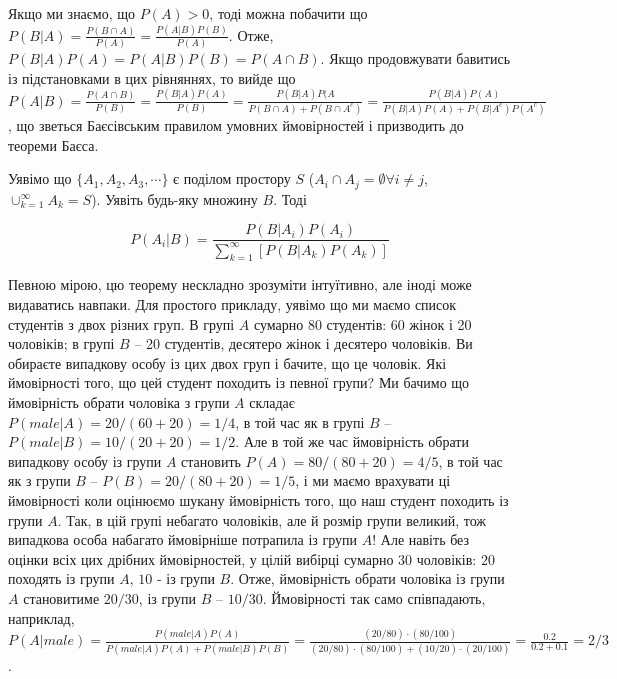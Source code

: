 \documentclass[
  11pt,
]{book}
\begin{document}
Якщо ми знаємо, що \(P(A)>0\), тоді можна побачити що \(P(B|A) = \frac{P(B \cap A)}{P(A)} = \frac{P(A | B)P(B)}{P(A)}\). Отже, \(P(B|A)P(A)=P(A|B)P(B)=P(A \cap B)\). Якщо продовжувати бавитись із підстановками в цих рівняннях, то вийде що \(P(A|B) = \frac{P(A \cap B)}{P(B)} = \frac{P(B|A) P(A)}{P(B)} = \frac{P(B|A)P(A}{P(B \cap A) + P(B \cap A^c)} = \frac{P(B|A)P(A)}{P(B|A) P(A) + P(B|A^c)P(A^c)}\), що зветься Баєсівським правилом умовних ймовірностей і призводить до теореми Баєса.

Уявімо що \(\{A_1, A_2, A_3, \cdots\}\) є поділом простору \(S\) (\(A_i \cap A_j = \emptyset \forall i \neq j\), \(\cup_{k=1}^{\infty} A_k = S\)). Уявіть будь-яку множину \(B\). Тоді

\[P(A_i|B) = \frac{P(B|A_i)P(A_i)}{\sum_{k=1}^{\infty}[P(B|A_k)P(A_k)]}\]

Певною мірою, цю теорему нескладно зрозуміти інтуїтивно, але іноді може видаватись навпаки. Для простого прикладу, уявімо що ми маємо список студентів з двох різних груп. В групі \(A\) сумарно 80 студентів: 60 жінок і 20 чоловіків; в групі \(B\) -- 20 студентів, десятеро жінок і десятеро чоловіків. Ви обираєте випадкову особу із цих двох груп і бачите, що це чоловік. Які ймовірності того, що цей студент походить із певної групи? Ми бачимо що ймовірність обрати чоловіка з групи \(A\) складає \(P(male|A) =  20/(60+20) = 1/4\), в той час як в групі \(B\) -- \(P(male|B) = 10/(20+20) = 1/2\). Але в той же час ймовірність обрати випадкову особу із групи \(A\) становить \(P(A) = 80/(80+20) = 4/5\), в той час як з групи \(B\) -- \(P(B) = 20/(80+20) = 1/5\), і ми маємо врахувати ці ймовірності коли оцінюємо шукану ймовірність того, що наш студент походить із групи \(A\). Так, в цій групі небагато чоловіків, але й розмір групи великий, тож випадкова особа набагато ймовірніше потрапила із групи \(A\)! Але навіть без оцінки всіх цих дрібних ймовірностей, у цілій вибірці сумарно \(30\) чоловіків: \(20\) походять із групи \(A\), \(10\) - із групи \(B\). Отже, ймовірність обрати чоловіка із групи \(A\) становитиме \(20/30\), із групи \(B\) -- \(10/30\). Ймовірності так само співпадають, наприклад, \(P(A|male) = \frac{P(male|A)P(A)}{P(male|A)P(A) + P(male|B)P(B)} = \frac{(20/80) \cdot (80/100)}{(20/80) \cdot (80/100) + (10/20) \cdot (20/100)} = \frac{0.2}{0.2+0.1}=2/3\).
\end{document}
